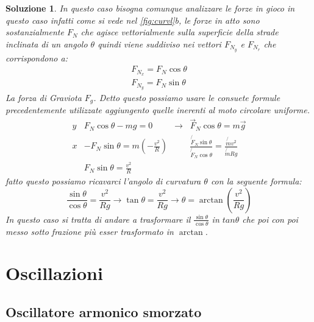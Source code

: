 \documentclass{article}
\newtheorem{sol}{Soluzione}[section]
\begin{document}
\begin{sol}
  In questo caso bisogna comunque analizzare le forze in gioco in questo caso infatti come si vede nel \ref{fig:curvl}b, le forze in atto sono sostanzialmente $F_N$ che agisce vettorialmente sulla superficie della strade inclinata di un angolo $\theta$ quindi viene suddiviso nei vettori $F_{N_y}$ e $F_{N_r}$ che corrispondono a:
  \begin{equation*}
    \begin{matrix}
      F_{N_x}=F_N\cos\theta\\
      F_{N_y}=F_N\sin\theta
    \end{matrix}
  \end{equation*}
  La forza di Graviota $F_g$. Detto questo possiamo usare le consuete formule precedentemente utilizzate aggiungento quelle inerenti al moto circolare uniforme.
  \begin{equation*}
    \begin{matrix}
      y & F_N\cos\theta-mg=0 & \to & \vec{F}_N\cos\theta=m\vec{g}\\
      x & -F_N\sin\theta=m\left(-\frac{v^2}{R}\right) && \frac{\not{F}_N\sin\theta}{\not{F}_N\cos\theta}=\frac{\not{m}v^2}{\not{m}Rg}\\
      & F_N\sin\theta=\frac{v^2}{R}
    \end{matrix}
  \end{equation*}
  fatto questo possiamo ricavarci l'angolo di curvatura $\theta$ con la seguente formula:
  \begin{equation*}
    \frac{\sin\theta}{\cos\theta}=\frac{v^2}{Rg}\to \tan\theta=\frac{v^2}{Rg} \to \theta=\arctan\left(\frac{v^2}{Rg}\right)
  \end{equation*}
  In questo caso si tratta di andare a trasformare il $\frac{\sin\theta}{\cos\theta}$ in $tan\theta$ che poi con poi messo sotto frazione più esser trasformato in $\arctan$.
\end{sol}

\section{Oscillazioni}
\label{sec:oscill}

\subsection{Oscillatore armonico smorzato}
\label{sec:osciarmsmo}
\end{document}
